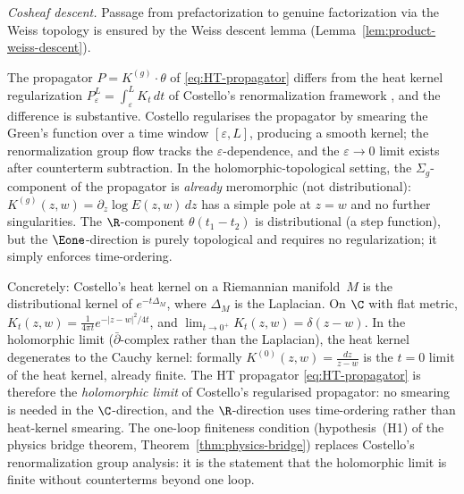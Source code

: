 \begin{definition}
\smallskip\noindent
\emph{Cosheaf descent.}
Passage from prefactorization to genuine factorization via the Weiss
topology is ensured by the Weiss descent lemma
(Lemma~\ref{lem:product-weiss-descent}).
\end{definition}

\begin{remark}
\label{rem:costello-renorm-comparison}
The propagator $P = K^{(g)} \cdot \theta$ of
\eqref{eq:HT-propagator} differs from the heat kernel regularization
$P_\varepsilon^L = \int_\varepsilon^L K_t\, dt$ of Costello's
renormalization framework \cite{Cos11}, and the difference is
substantive.
Costello regularises the propagator by smearing the Green's
function over a time window $[\varepsilon, L]$, producing a smooth
kernel; the renormalization group flow tracks the
$\varepsilon$-dependence, and the $\varepsilon \to 0$ limit exists
after counterterm subtraction. In the holomorphic-topological
setting, the $\Sigma_g$-component of the propagator is \emph{already}
meromorphic (not distributional): $K^{(g)}(z,w) =
\partial_z\log E(z,w)\,dz$ has a simple pole at $z = w$ and no
further singularities. The $\R$-component $\theta(t_1 - t_2)$ is
distributional (a step function), but the $\Eone$-direction is
purely topological and requires no regularization; it simply
enforces time-ordering.

Concretely: Costello's heat kernel on a Riemannian manifold~$M$ is
the distributional kernel of $e^{-t\Delta_M}$, where $\Delta_M$ is
the Laplacian. On $\C$ with flat metric,
$K_t(z,w) = \frac{1}{4\pi t}e^{-|z-w|^2/4t}$, and
$\lim_{t \to 0^+} K_t(z,w) = \delta(z-w)$.
In the holomorphic limit ($\bar\partial$-complex rather than the
Laplacian), the heat kernel degenerates to the Cauchy kernel:
formally $K^{(0)}(z,w) = \frac{dz}{z-w}$ is the $t = 0$ limit
of the heat kernel, already finite. The HT propagator
\eqref{eq:HT-propagator} is therefore the \emph{holomorphic limit}
of Costello's regularised propagator: no smearing is needed in the
$\C$-direction, and the $\R$-direction uses time-ordering rather than
heat-kernel smearing. The one-loop finiteness condition
(hypothesis~(H1) of the physics bridge theorem,
Theorem~\ref{thm:physics-bridge}) replaces Costello's
renormalization group analysis: it is the statement that the
holomorphic limit is finite without counterterms beyond one loop.
\end{remark}

